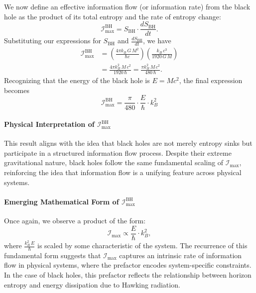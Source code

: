 \documentclass[12pt]{article}
\begin{document}
We now define an effective information flow (or information rate) from the black hole as the product of its total entropy and the rate of entropy change:
\begin{equation}
    \mathcal{I}_{\text{max}}^{\text{BH}} = S_{\text{BH}} \cdot \frac{dS_{\text{BH}}}{dt}.
\end{equation}
Substituting our expressions for \(S_{\text{BH}}\) and \(\frac{dS_{\text{BH}}}{dt}\), we have
\begin{align}
    \mathcal{I}_{\text{max}}^{\text{BH}} 
    &= \left(\frac{4\pi k_B\, G\, M^2}{\hbar c}\right)
    \left(\frac{k_B\, c^3}{1920\, G\, M}\right) \nonumber \\
    &= \frac{4\pi k_B^2\, M\, c^2}{1920\, \hbar}
    = \frac{\pi k_B^2\, M\, c^2}{480\, \hbar}.
\end{align}
Recognizing that the energy of the black hole is \(E = M c^2\), the final expression becomes
\begin{equation}
    \mathcal{I}_{\text{max}}^{\text{BH}} = \frac{\pi}{480} \cdot \frac{E}{\hbar} \cdot k_B^2
\end{equation}

\paragraph{Physical Interpretation of \(\mathcal{I}_{\text{max}}^{\text{BH}}\)}
This result aligns with the idea that black holes are not merely entropy sinks but participate in a structured information flow process. Despite their extreme gravitational nature, black holes follow the same fundamental scaling of \(\mathcal{I}_{\text{max}}\), reinforcing the idea that information flow is a unifying feature across physical systems.

\paragraph{Emerging Mathematical Form of \(\mathcal{I}_{\text{max}}^{\text{BH}}\)}
Once again, we observe a product of the form:
\begin{equation}
    \mathcal{I}_{\text{max}} \propto \frac{E}{\hbar} \cdot k_B^2,
\end{equation}
where \(\frac{k_B^2\,E}{\hbar}\) is scaled by some characteristic of the system. The recurrence of this fundamental form suggests that \(\mathcal{I}_{\text{max}}\) captures an intrinsic rate of information flow in physical systems, where the prefactor encodes system-specific constraints. In the case of black holes, this prefactor reflects the relationship between horizon entropy and energy dissipation due to Hawking radiation.
\end{document}

